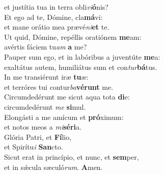 \oddverse et justítia tua in terra obli\textit{vi}\textbf{ó}nis?\\
\evenverse Et ego ad te, Dómine, cla\textbf{má}vi:~\*\\
\evenverse et mane orátio mea prævé\textit{ni}\textbf{et} te.\\
\oddverse Ut quid, Dómine, repéllis oratiónem \textbf{me}am:~\*\\
\oddverse avértis fáciem tu\textit{am} \textbf{a} me?\\
\evenverse Pauper sum ego, et in labóribus a juventúte \textbf{me}a:~\*\\
\evenverse exaltátus autem, humiliátus sum et con\textit{tur}\textbf{bá}tus.\\
\oddverse In me transiérunt iræ \textbf{tu}æ:~\*\\
\oddverse et terróres tui contur\textit{ba}\textbf{vé}\textbf{runt} me.\\
\evenverse Circumdedérunt me sicut aqua tota \textbf{di}e:~\*\\
\evenverse circumdedérunt \textit{me} \textbf{si}mul.\\
\oddverse Elongásti a me amícum et \textbf{pró}ximum:~\*\\
\oddverse et notos meos a \textit{mi}\textbf{sé}\textbf{ri}a.\\
\evenverse Glória Patri, et \textbf{Fí}lio,~\*\\
\evenverse et Spirítu\textit{i} \textbf{San}cto.\\
\oddverse Sicut erat in princípio, et nunc, et \textbf{sem}per,~\*\\
\oddverse et in sǽcula sæculó\textit{rum}. \textbf{A}men.\\
